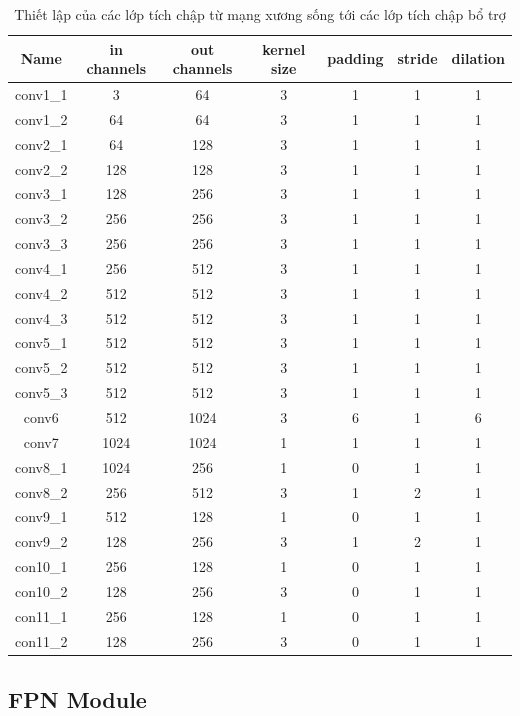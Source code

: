\documentclass[a4paper]{article}
\begin{document}
\begin{table}[!htbp]
	\centering
	\caption{Thiết lập của các lớp tích chập từ mạng xương sống tới các lớp tích chập bổ trợ}
	\begin{tabular}{c|c|c|c|c|c|c}
		\toprule
		Name & in channels & out channels & kernel size & padding & stride & dilation \\
		\midrule
		conv1\_1 &   3  & 64   & 3 & 1 & 1 & 1 \\
		conv1\_2 &  64  & 64   & 3 & 1 & 1 & 1 \\
		conv2\_1 &  64  & 128  & 3 & 1 & 1 & 1 \\
		conv2\_2 & 128  & 128  & 3 & 1 & 1 & 1 \\
		conv3\_1 & 128  & 256  & 3 & 1 & 1 & 1 \\
		conv3\_2 & 256  & 256  & 3 & 1 & 1 & 1 \\
		conv3\_3 & 256  & 256  & 3 & 1 & 1 & 1 \\
		conv4\_1 & 256  & 512  & 3 & 1 & 1 & 1 \\
		conv4\_2 & 512  & 512  & 3 & 1 & 1 & 1 \\
		conv4\_3 & 512  & 512  & 3 & 1 & 1 & 1 \\
		conv5\_1 & 512  & 512  & 3 & 1 & 1 & 1 \\
		conv5\_2 & 512  & 512  & 3 & 1 & 1 & 1 \\
		conv5\_3 & 512  & 512  & 3 & 1 & 1 & 1 \\
		conv6    & 512  & 1024 & 3 & 6 & 1 & 6 \\
		conv7    & 1024 & 1024 & 1 & 1 & 1 & 1 \\
		conv8\_1 & 1024 & 256  & 1 & 0 & 1 & 1 \\
		conv8\_2 & 256  & 512  & 3 & 1 & 2 & 1 \\
		conv9\_1 & 512  & 128  & 1 & 0 & 1 & 1 \\
		conv9\_2 & 128  & 256  & 3 & 1 & 2 & 1 \\
		con10\_1 & 256  & 128  & 1 & 0 & 1 & 1 \\
		con10\_2 & 128  & 256  & 3 & 0 & 1 & 1 \\
		con11\_1 & 256  & 128  & 1 & 0 & 1 & 1 \\
		con11\_2 & 128  & 256  & 3 & 0 & 1 & 1 \\
		\bottomrule
	\end{tabular}%
	\label{tab:addlabel}%
\end{table}%

\subsection{\textbf{FPN Module}}
\end{document}

